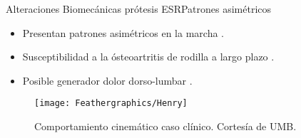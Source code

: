 \documentclass[10pt]{beamer}
\begin{document}
\begin{frame}{Alteraciones Biomecánicas prótesis ESR}{Patrones asimétricos}

\begin{alertblock}{}

\begin{itemize}
\item {\scriptsize{}Presentan patrones asimétricos en la marcha \cite{Au2009,Martinez-Villalpando2011,Hill2013a,Bateni2002}.}{\scriptsize \par}
\item {\scriptsize{}Susceptibilidad a la ósteoartritis de rodilla a largo
plazo \cite{Grabowski2013}.}{\scriptsize \par}
\item {\scriptsize{}Posible generador dolor dorso-lumbar \cite{Devan2014}.}{\scriptsize \par}
\end{itemize}
\begin{figure}
\begin{centering}
\texttt{[image: Feathergraphics/Henry]}
\par\end{centering}
\caption{Comportamiento cinemático caso clínico. Cortesía de UMB.}

\end{figure}

\end{alertblock}
\end{frame}
\end{document}
